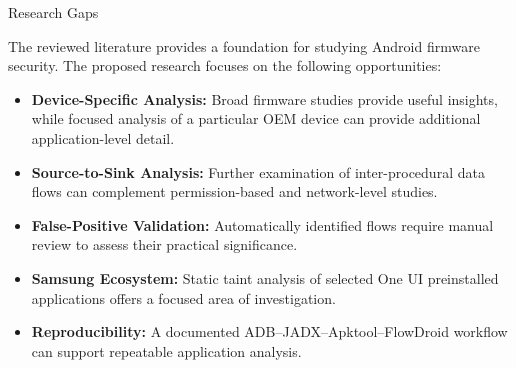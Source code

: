 \documentclass[aspectratio=169,10pt]{beamer}
\begin{document}
\begin{frame}{Research Gaps}

The reviewed literature provides a foundation for studying Android firmware security. The proposed research focuses on the following opportunities:

\begin{itemize}

    \item \textbf{Device-Specific Analysis:}
    Broad firmware studies provide useful insights, while focused analysis of a particular OEM device can provide additional application-level detail.

    \vspace{4pt}

    \item \textbf{Source-to-Sink Analysis:}
    Further examination of inter-procedural data flows can complement permission-based and network-level studies.

    \vspace{4pt}

    \item \textbf{False-Positive Validation:}
    Automatically identified flows require manual review to assess their practical significance.

    \vspace{4pt}

    \item \textbf{Samsung Ecosystem:}
    Static taint analysis of selected One UI preinstalled applications offers a focused area of investigation.

    \vspace{4pt}

    \item \textbf{Reproducibility:}
    A documented ADB--JADX--Apktool--FlowDroid workflow can support repeatable application analysis.

\end{itemize}

\end{frame}

\end{document}
